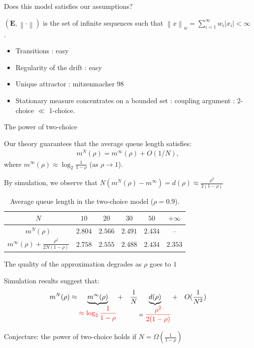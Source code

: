 \documentclass{beamer}
\newcommand\norm[1]{\left\|#1\right\|}
\newcommand\abs[1]{\left|#1\right|}
\newcommand\bE{\mathbf{E}}
\begin{document}
\begin{frame}{Does this model satisfies our assumptions? }
  
  $(\bE,\norm{\cdot})$ is the set of infinite sequences such that
  $\norm{x}_w=\sum_{i=1}^\infty w_i\abs{x_i}<\infty$. 

  \begin{itemize}
  \item Transitions : easy
  \item Regularity of the drift : easy
  \item Unique attractor : mitzenmacher 98
  \item Stationary measure concentrates on a bounded set : coupling
    argument : 2-choice $\ll$ 1-choice. 
  \end{itemize}
\end{frame}


\begin{frame}{The power of two-choice}
  
  
  Our theory guarantees that the average queue length satisfies:
  \begin{align*}
    m^N(\rho) = m^{\infty}(\rho) + O(1/N),
  \end{align*}
  where  $m^{\infty}(\rho) \approx 
  \log_2\frac1{1-\rho}$ (as $\rho\to1$). 

  \pause\bigskip 
  By simulation, we observe that
  $N(m^N(\rho)-m^{\infty})=d(\rho)\approx\frac{\rho^2}{2(1-\rho)}$
  

  \begin{table}[t]
    \centering
    \begin{tabular}{@{}|@{}c@{}|c|c|c|c|c|}
      \hline
      $N$
      &$  10$  &$  20$  &$  30$  &$  50$ & $+\infty$  \\\hline $m^N(\rho)$
      &$2.804$ &$2.566$ &$2.491$ &$2.434$&-- \\\hline $m^\infty(\rho)+\frac{\rho^2}{2N(1-\rho)}$ 
      &$2.758$ &$2.555$ &$2.488$ &$2.434$&$2.353$ \\
      \hline
    \end{tabular}
  \caption{Average queue length in the two-choice model ($\rho=0.9$).}
  \label{tab:2}
\end{table}
  
\end{frame}

\begin{frame}{The quality of the approximation degrades as $\rho$
    goes to $1$}


  Simulation results suggest that: 
  \begin{align*}
    m^N(\rho) \approx \underbrace{m^{\infty}(\rho)}_{\displaystyle\color{red}\approx
    \log_2\frac1{1-\rho}} + \quad \frac1{N}\underbrace{d(\rho)}_{\approx \displaystyle\color{red}
    \frac{\rho^2}{2(1-\rho)}} +\quad O(\frac1{N^2})
  \end{align*}
  \bigskip
  

  \bigskip
  
  Conjecture: the power of two-choice holds if $N = \Omega(\frac1{1-\rho})$
\end{frame}
\end{document}
